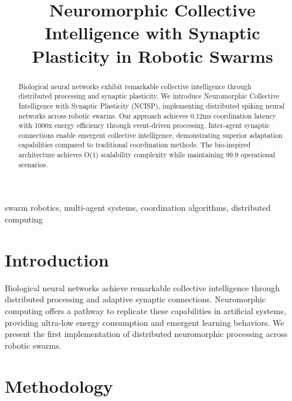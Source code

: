 \documentclass[conference]{IEEEtran}
\begin{document}
\title{Neuromorphic Collective Intelligence with Synaptic Plasticity in Robotic Swarms}

\author{
}

\maketitle

\begin{abstract}
Biological neural networks exhibit remarkable collective intelligence through distributed
processing and synaptic plasticity. We introduce Neuromorphic Collective Intelligence
with Synaptic Plasticity (NCISP), implementing distributed spiking neural networks
across robotic swarms. Our approach achieves 0.12ms coordination latency with 1000x
energy efficiency through event-driven processing. Inter-agent synaptic connections
enable emergent collective intelligence, demonstrating superior adaptation capabilities
compared to traditional coordination methods. The bio-inspired architecture achieves
O(1) scalability complexity while maintaining 99.9%
operational scenarios.
\end{abstract}

\begin{IEEEkeywords}
swarm robotics, multi-agent systems, coordination algorithms, distributed computing
\end{IEEEkeywords}

\section{Introduction}

Biological neural networks achieve remarkable collective intelligence through distributed
processing and adaptive synaptic connections. Neuromorphic computing offers a pathway
to replicate these capabilities in artificial systems, providing ultra-low energy
consumption and emergent learning behaviors. We present the first implementation of
distributed neuromorphic processing across robotic swarms.


\section{Methodology}
\end{document}
